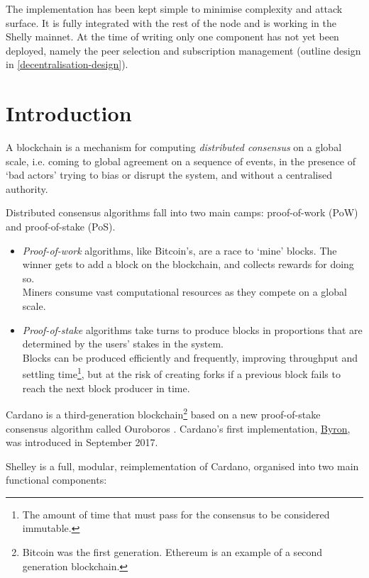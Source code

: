 \documentclass[11pt,a4paper]{article}
\begin{document}
The implementation has been kept simple to minimise complexity and
attack surface. It is fully integrated with the rest of the node and is
working in the Shelly mainnet. At the time of writing only one component
has not yet been deployed, namely the peer selection and subscription
management (outline design in \cref{decentralisation-design}).

\section{Introduction}
\label{introduction}

A blockchain is a mechanism for computing \emph{distributed consensus}
on a global scale, i.e. coming to global agreement on a sequence of
events, in the presence of `bad actors' trying to bias or disrupt the
system, and without a centralised authority.

Distributed consensus algorithms fall into two main camps: proof-of-work
(PoW) and proof-of-stake (PoS).

\begin{itemize}
\item
  \emph{Proof-of-work} algorithms, like Bitcoin's, are a race to
  `mine' blocks. The winner gets to add a block on the blockchain, and
  collects rewards for doing so.\\
  Miners consume vast computational resources as they compete on a
  global scale.
\item
  \emph{Proof-of-stake} algorithms take turns to produce blocks in
  proportions that are determined by the users' stakes in the system.\\
  Blocks can be produced efficiently and frequently, improving
  throughput and settling time\footnote{The amount of time that must
    pass for the consensus to be considered immutable.}, but at the risk
  of creating forks if a previous block fails to reach the next block
  producer in time.
\end{itemize}

Cardano is a third-generation blockchain\footnote{Bitcoin was the first
  generation. Ethereum is an example of a second generation blockchain.}
based on a new proof-of-stake consensus algorithm called Ouroboros
\cite{BGKR17, BGKRZ19}. Cardano's first implementation,
\href{https://cardanoroadmap.com/en/byron/}{{Byron}}, was introduced in
September 2017.

Shelley is a full, modular, reimplementation of Cardano, organised into
two main functional components:
\end{document}
